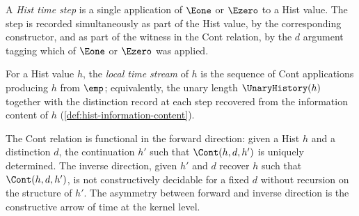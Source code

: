 \begin{definition}
\label{def:hist-time-step}
A \emph{Hist time step} is a single application of \(\Eone\) or \(\Ezero\) to a Hist value. The step is recorded simultaneously as part of the Hist value, by the corresponding constructor, and as part of the witness in the Cont relation, by the \(d\) argument tagging which of \(\Eone\) or \(\Ezero\) was applied.
\end{definition}
\begin{definition}
\label{def:hist-local-time-stream}
For a Hist value \(h\), the \emph{local time stream} of \(h\) is the sequence of Cont applications producing \(h\) from \(\emp\); equivalently, the unary length \(\UnaryHistory(h)\) together with the distinction record at each step recovered from the information content of \(h\) (\autoref{def:hist-information-content}).
\end{definition}
\begin{theorem}
\label{thm:cont-time-asymmetric}
The Cont relation is functional in the forward direction: given a Hist \(h\) and a distinction \(d\), the continuation \(h'\) such that \(\Cont(h, d, h')\) is uniquely determined. The inverse direction, given \(h'\) and \(d\) recover \(h\) such that \(\Cont(h, d, h')\), is not constructively decidable for a fixed \(d\) without recursion on the structure of \(h'\). The asymmetry between forward and inverse direction is the constructive arrow of time at the kernel level.
\end{theorem}
